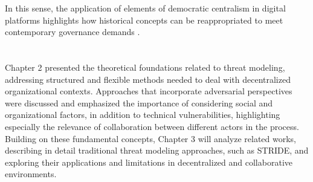 In this sense, the application of elements of democratic centralism in digital
platforms highlights how historical concepts can be reappropriated to meet
contemporary governance demands \cite{Colbac}.

\section*{} 
Chapter 2 presented the theoretical foundations related to threat modeling,
addressing structured and flexible methods needed to deal with decentralized
organizational contexts. Approaches that incorporate adversarial perspectives
were discussed and emphasized the importance of considering social and
organizational factors, in addition to technical vulnerabilities, highlighting
especially the relevance of collaboration between different actors in the
process. Building on these fundamental concepts, Chapter 3 will analyze related
works, describing in detail traditional threat modeling approaches, such as
STRIDE, and exploring their applications and limitations in decentralized and
collaborative environments.
